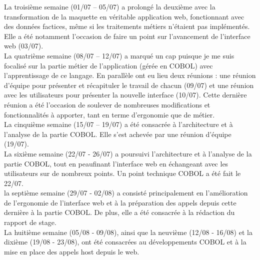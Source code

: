 \documentclass[a4paper,french,12pt]{article}
\begin{document}
		La troisième semaine (01/07 – 05/07) a prolongé la deuxième avec la transformation de la maquette en véritable application web, fonctionnant avec des données factices, 
		même si les traitements métiers n'étaient pas implémentés.
		Elle a été notamment l’occasion de faire un point sur l’avancement de l’interface web (03/07).\\ 

		La quatrième semaine (08/07 – 12/07) a marqué un cap puisque je me suis focalisé sur la partie métier de l’application (gérée en COBOL) avec l’apprentissage de ce langage. 
		En parallèle ont eu lieu deux réunions : une réunion d’équipe pour présenter et récapituler le travail de chacun (09/07) et une réunion avec les utilisateurs pour présenter la nouvelle interface (10/07). 
		Cette dernière réunion a été l’occasion de soulever de nombreuses modifications et fonctionnalités à apporter, tant en terme d’ergonomie que de métier.\\

		La cinquième semaine (15/07 – 19/07) a été consacrée à l’architecture et à l’analyse de la partie COBOL. Elle s’est achevée par une réunion d’équipe (19/07). \\ 
		
		La sixième semaine (22/07 - 26/07) a poursuivi l’architecture et à l’analyse de la partie COBOL, tout en peaufinant l'interface web en échangeant avec les utilisateurs sur de nombreux points.
		Un point technique COBOL a été fait le 22/07.\\ 
		
		la septième semaine (29/07 - 02/08) a consisté principalement en l'amélioration de l'ergonomie de l'interface web et à la préparation des appels depuis cette dernière à la partie COBOL. De plus,
		elle a été consacrée à la rédaction du rapport de stage.
		\\ 
		
		La huitième semaine (05/08 - 09/08), ainsi que la neuvième (12/08 - 16/08) et la dixième (19/08 - 23/08), ont été consacrées au développements COBOL 
		et à la mise en place des appels host depuis le web.\\ 
	
\end{document}
